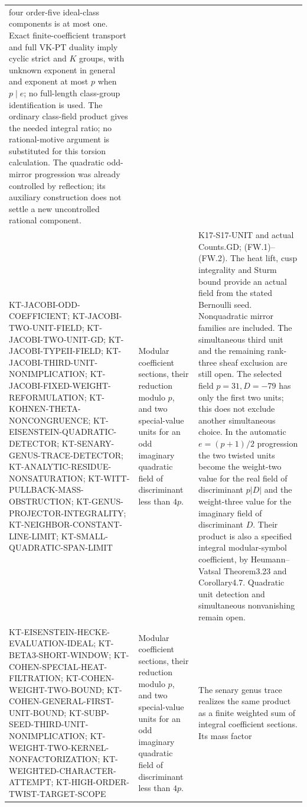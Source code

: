 \documentclass[11pt,a4paper]{article}
\theoremstyle{definition}
\begin{document}
\begin{longtable}{>{\raggedright\arraybackslash}p{}
>{\raggedright\arraybackslash}p{}
>{\raggedright\arraybackslash}p{}}
four order-five ideal-class components is at most one. Exact
finite-coefficient transport and full VK-PT duality imply cyclic
strict and $K$ groups, with unknown exponent in general and
exponent at most $p$ when $p\mid e$; no full-length
class-group identification is used. The ordinary class-field
product gives the needed integral ratio; no rational-motive
argument is substituted for this torsion calculation. The
quadratic odd-mirror progression was already controlled by
reflection; its auxiliary construction does not settle a new
uncontrolled rational component.\\
KT-JACOBI-ODD-COEFFICIENT;
KT-JACOBI-TWO-UNIT-FIELD;
KT-JACOBI-TWO-UNIT-GD; KT-JACOBI-TYPEII-FIELD;
KT-JACOBI-THIRD-UNIT-NONIMPLICATION;
KT-JACOBI-FIXED-WEIGHT-REFORMULATION;
KT-KOHNEN-THETA-NONCONGRUENCE;
KT-EISENSTEIN-QUADRATIC-DETECTOR;
KT-SENARY-GENUS-TRACE-DETECTOR;
KT-ANALYTIC-RESIDUE-NONSATURATION;
KT-WITT-PULLBACK-MASS-OBSTRUCTION;
KT-GENUS-PROJECTOR-INTEGRALITY;
KT-NEIGHBOR-CONSTANT-LINE-LIMIT;
KT-SMALL-QUADRATIC-SPAN-LIMIT &
Modular coefficient sections, their reduction modulo $p$,
and two special-value units for an odd imaginary quadratic
field of discriminant less than $4p$. &
K17-S17-UNIT and actual Counts.GD; (FW.1)--(FW.2).
The heat lift, cusp integrality and Sturm bound provide an
actual field from the stated Bernoulli seed. Nonquadratic
mirror families are included. The simultaneous third unit
and the remaining rank-three sheaf exclusion are still open.
The selected field $p=31,D=-79$ has only the first two units;
this does not exclude another simultaneous choice. In the
automatic $e=(p+1)/2$ progression the two twisted units become
the weight-two value for the real field of discriminant $p|D|$
and the weight-three value for the imaginary field of
discriminant $D$. Their product is also a specified integral modular-symbol coefficient,
by Heumann--Vatsal Theorem3.23 and Corollary4.7. Quadratic
unit detection and simultaneous nonvanishing remain open.\\
KT-EISENSTEIN-HECKE-EVALUATION-IDEAL;
KT-BETA3-SHORT-WINDOW;
KT-COHEN-SPECIAL-HEAT-FILTRATION;
KT-COHEN-WEIGHT-TWO-BOUND;
KT-COHEN-GENERAL-FIRST-UNIT-BOUND;
KT-SUBP-SEED-THIRD-UNIT-NONIMPLICATION;
KT-WEIGHT-TWO-KERNEL-NONFACTORIZATION;
KT-WEIGHTED-CHARACTER-ATTEMPT;
KT-HIGH-ORDER-TWIST-TARGET-SCOPE &
Modular coefficient sections, their reduction modulo $p$,
and two special-value units for an odd imaginary quadratic
field of discriminant less than $4p$. &
The senary genus trace realizes the same product as a finite
weighted sum of integral coefficient sections. Its mass factor

\end{longtable}
\end{document}
